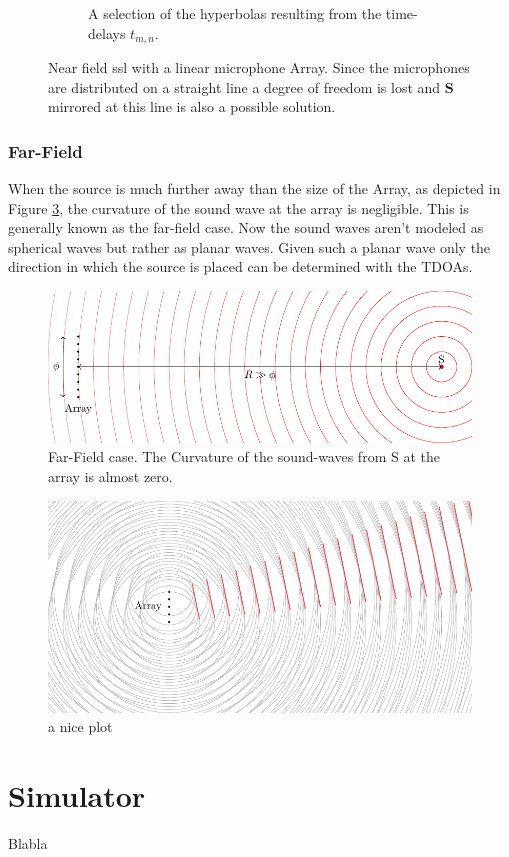 \begin{figure}[h]
\begin{subfigure}[b]{0.45\textwidth}
    \caption{A selection of the hyperbolas resulting from the time-delays $t_{m,n}$.}
    \label{ssl:fig:hyperbola}
  \end{subfigure}
  \caption{Near field \acrshort{ssl} with a linear microphone Array. 
  Since the microphones are distributed on a straight line a degree of freedom is lost and
  $\bm{S}$ mirrored at this line is also a possible solution.}
  \label{fig:three graphs}
\end{figure}

\subsubsection{Far-Field}
When the source is much further away than the size of the Array, as depicted
in Figure \ref{ssl:fig:far field}, the curvature of the sound wave at the array is negligible.
This is generally known as the far-field case.
Now the sound waves aren't modeled as spherical waves but rather as planar waves.
Given such a planar wave only the direction in which the source is placed can be determined with the TDOAs.



\begin{figure}
  \centering
  \includegraphics[]{FarField.pdf}
  \caption{Far-Field case. The Curvature of the sound-waves from S at the array
  is almost zero.}
  \label{ssl:fig:far field}
\end{figure}



\begin{figure}
  \centering
  \includegraphics[]{beamforming_1.pdf}
  \caption{a nice plot}
  \label{fig:mesh1}
\end{figure}

\newpage
\section{Simulator}
Blabla
